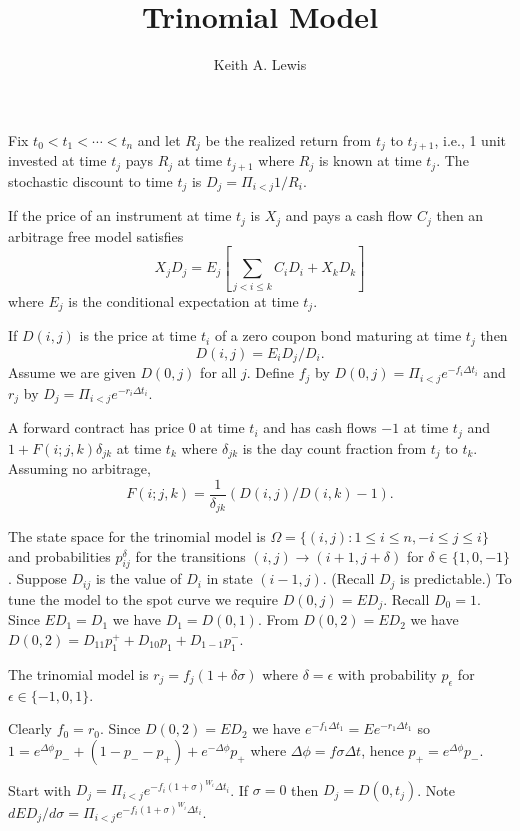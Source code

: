 \documentclass[12pt,letterpaper]{report}
\author{Keith A. Lewis}
\title{Trinomial Model}
\begin{document}
\maketitle
Fix \(t_0 < t_1 < \cdots < t_n\) and let \(R_j\) be the realized return
from \(t_j\) to \(t_{j+1}\), i.e., 1 unit invested at time \(t_j\)
pays \(R_j\) at time \(t_{j+1}\) where \(R_j\) is known at
time \(t_j\). The stochastic discount to time \(t_j\)
is \(D_j = \Pi_{i<j}1/R_i\).

If the price of an instrument at time \(t_j\) is \(X_j\) and pays a cash flow
\(C_j\) then an arbitrage free model satisfies
\[
X_j D_j = E_j\left[\sum_{j<i\le k} C_i D_i + X_k D_k\right]
\]
where \(E_j\) is the conditional expectation at time \(t_j\).

If \(D(i,j)\) is the price at time \(t_i\) of a zero coupon bond maturing at
time \(t_j\) then 
\[D(i,j) = E_iD_j/D_i.
\]
Assume we are given \(D(0,j)\)
for all \(j\). Define \(f_j\) by \(D(0,j) = \Pi_{i<j}e^{-f_i\Delta t_i}\)
and \(r_j\) by \(D_j = \Pi_{i<j}e^{-r_i\Delta t_i}\).

A forward contract has price \(0\) at time \(t_i\) and has cash flows
\(-1\) at time \(t_j\) and \(1 + F(i;j,k)\delta_{jk}\) at time \(t_k\)
where \(\delta_{jk}\) is the day count fraction from \(t_j\) to
\(t_k\). Assuming no arbitrage, 
\[
	F(i;j,k) = \frac{1}{\delta_{jk}}\left(D(i,j)/D(i,k) - 1\right).
\]

The state space for the trinomial model is \(\Omega = \{(i,j)\colon 1\le i\le n, -i\le j\le i\}\)
and probabilities \(p_{ij}^\delta\) for the
transitions \((i,j)\to (i + 1,j + \delta)\) for \(\delta\in\{1,0,-1\}\).
Suppose \(D_{ij}\) is the value of \(D_i\) in state \((i-1,j)\).
(Recall \(D_j\) is predictable.)
To tune the model to the spot curve we require \(D(0,j) = E D_j\).
Recall \(D_0 = 1\). Since \(E D_1 = D_1\) we have \(D_1 = D(0,1)\).
From \(D(0,2) = ED_2\) we have \(D(0,2) = D_{11}p_1^+ + D_{10}p_1 + D_{1-1}p_1^-\).

The trinomial model is \(r_j = f_j(1 + \delta\sigma)\) where
\(\delta = \epsilon\) with probability \(p_\epsilon\) for
\(\epsilon\in\{-1,0,1\}\).

Clearly \(f_0 = r_0\). Since \(D(0,2) = ED_2\) we have
\(e^{-f_1\Delta t_1} = Ee^{-r_1\Delta t_1}\) so \(
1 = e^{\Delta\phi}p_- + (1 - p_- - p_+) +e^{-\Delta\phi}p_+
\) where \(\Delta\phi = f\sigma\Delta t\), hence
\(p_+ = e^{\Delta\phi} p_-\).

Start with \(D_j = \Pi_{i<j}e^{-f_i(1+\sigma)^{W_i}\Delta t_i}\).
If \(\sigma = 0\) then \(D_j = D(0,t_j)\).
Note \(dED_j/d\sigma = \Pi_{i<j}e^{-f_i(1+\sigma)^{W_i}\Delta t_i}\).
\end{document}
